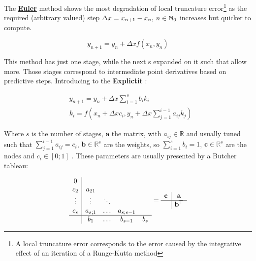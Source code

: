 The \underline{\textbf{Euler}} method shows the most degradation of local truncature error\footnote{A local truncature error corresponds to the error caused by the integrative effect of an iteration of a Runge-Kutta method} as the required (arbitrary valued) step \(\Delta x = x_{n+1} - x_n, \hspace{0.2em} n \in \mathbb{N}_0\) increases but quicker to compute.

\begin{equation}
    y_{n+1} = y_{n} + \Delta x f(x_{n}, y_{n})
    \label{eq:Euler_Method}
\end{equation}

This method has just one stage, while the next s expanded on it such that allow more. Those stages correspond to intermediate point derivatives based on predictive steps. Introducing to the \textbf{Explictit } \label{subsubsub:RK_Explicit}:


\begin{subequations}
    \begin{align}
        &y_{n+1} = y_n + \Delta x \sum^s_{i=1}b_i k_i \label{eq:Update_RKbased} \\
        &k_i = f(x_n + \Delta x c_i, y_n + \Delta x \sum^{i-1}_{j=1} a_{ij}k_j) \label{eq:Derivatives_Explicit-RK}  
    \end{align}
    \label{eq:Explicit-RK}  
\end{subequations}

Where \(s\) is the number of stages, \(\mathbf{a}\) the  matrix, with \(a_{ij} \in \mathbb{R}\) and usually tuned such that \(\sum^{i-1}_{j=1} a_{ij} = c_i\), \(\mathbf{b} \in \mathbb{R}^s\) are the weights, so \(\sum^s_{i=1} b_i = 1\), \(\mathbf{c} \in \mathbb{R}^s\) are the nodes and \(c_i \in [0;1]\) . These parameters are usually presented by a Butcher tableau:

\begin{equation}
    \begin{array}{c|cccc}
        0\\
        c_2 & a_{21}\\
        \vdots & \vdots &\ddots \\
        c_s & a_{s;1} & \hdots & a_{s;s-1}\\
        \hline
        & b_1 & \hdots & b_{s-1} & b_s  
    \end{array} = 
    \begin{array}{c|c}
        \mathbf{c} & \mathbf{a} \\
        \hline
        & \mathbf{b}^\top  
    \end{array}
    \label{eq:Explicit_Butcher_Tableu}
\end{equation}


